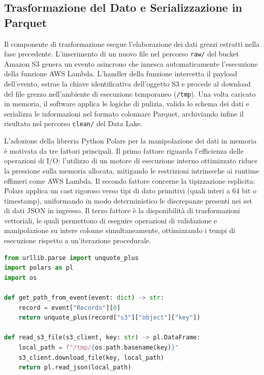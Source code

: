 \subsection{Trasformazione del Dato e Serializzazione in Parquet}

Il componente di trasformazione esegue l'elaborazione dei dati grezzi estratti nella fase precedente. L'inserimento di un nuovo file nel percorso \texttt{raw/} del bucket Amazon S3 genera un evento asincrono che innesca automaticamente l'esecuzione della funzione AWS Lambda. L'handler della funzione intercetta il payload dell'evento, estrae la chiave identificativa dell'oggetto S3 e procede al download del file grezzo nell'ambiente di esecuzione temporaneo (\texttt{/tmp}). Una volta caricato in memoria, il software applica le logiche di pulizia, valida lo schema dei dati e serializza le informazioni nel formato colonnare Parquet, archiviando infine il risultato nel percorso \texttt{clean/} del Data Lake.

L'adozione della libreria Python Polars \cite{Polars} per la manipolazione dei dati in memoria è motivata da tre fattori principali. Il primo fattore riguarda l'efficienza delle operazioni di I/O: l'utilizzo di un motore di esecuzione interno ottimizzato riduce la pressione sulla memoria allocata, mitigando le restrizioni intrinseche ai runtime effimeri come AWS Lambda. Il secondo fattore concerne la tipizzazione esplicita: Polars applica un cast rigoroso verso tipi di dato primitivi (quali interi a 64 bit o timestamp), uniformando in modo deterministico le discrepanze presenti nei set di dati JSON in ingresso. Il terzo fattore è la disponibilità di trasformazioni vettoriali, le quali permettono di eseguire operazioni di validazione e manipolazione su intere colonne simultaneamente, ottimizzando i tempi di esecuzione rispetto a un'iterazione procedurale.

\begin{lstlisting}[language=Python,caption={Estrazione della chiave dall'evento S3 e caricamento del file JSON in un DataFrame Polars},label={lst:s3-extract}]
from urllib.parse import unquote_plus
import polars as pl
import os

def get_path_from_event(event: dict) -> str:
    record = event["Records"][0]
    return unquote_plus(record["s3"]["object"]["key"])

def read_s3_file(s3_client, key: str) -> pl.DataFrame:
    local_path = f"/tmp/{os.path.basename(key)}"
    s3_client.download_file(key, local_path)
    return pl.read_json(local_path)
\end{lstlisting}

